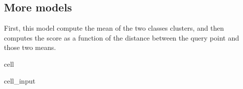 \documentclass[letterpaper,10pt,english]{jupyterBook}
\begin{document}
\subsection{More models}
\label{\detokenize{06:more-models}}
\sphinxAtStartPar
First, this model compute the mean of the two classes clusters, and then computes the score as a function of the distance between the query point and those two means.

\begin{sphinxuseclass}{cell}\begin{sphinxVerbatimInput}

\begin{sphinxuseclass}{cell_input}
\begin{sphinxVerbatim}[commandchars=\\\{\}]
  
      
      \PYG{p}{[}\PYG{p}{]}
        \PYG{p}{[}\PYG{p}{]}
        \PYG{p}{[}\PYG{p}{]}
      \PYG{p}{[} \PYG{p}{]} 
      \PYG{p}{[} \PYG{p}{]} 
          
          
         
\end{sphinxVerbatim}

\end{sphinxuseclass}\end{sphinxVerbatimInput}

\end{sphinxuseclass}
\end{document}
